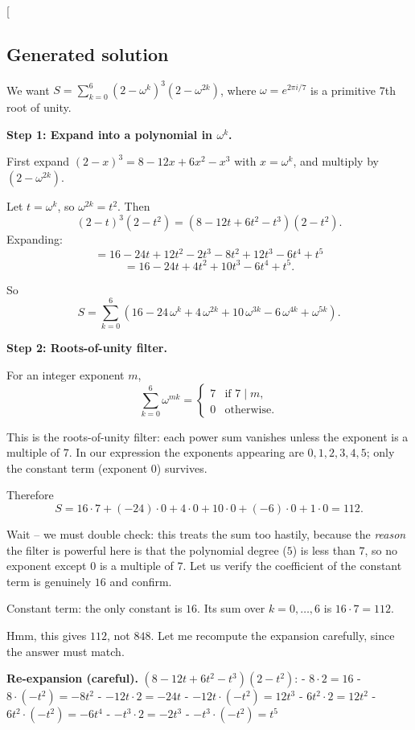 \documentclass[
  11pt,
  letterpaper,
]{article}
\begin{document}
{[}\boxed{848}{]}

\subsection{Generated solution}\label{generated-solution-2}

We want \(S=\sum_{k=0}^{6}(2-\omega^k)^3(2-\omega^{2k})\), where
\(\omega=e^{2\pi i/7}\) is a primitive 7th root of unity.

\textbf{Step 1: Expand into a polynomial in \(\omega^k\).}

First expand \((2-x)^3 = 8 - 12x + 6x^2 - x^3\) with \(x=\omega^k\), and
multiply by \((2-\omega^{2k})\).

Let \(t=\omega^k\), so \(\omega^{2k}=t^2\). Then
\[(2-t)^3(2-t^2) = (8 - 12t + 6t^2 - t^3)(2 - t^2).\] Expanding:
\[= 16 - 24t + 12t^2 - 2t^3 - 8t^2 + 12t^3 - 6t^4 + t^5\]
\[= 16 - 24t + 4t^2 + 10t^3 - 6t^4 + t^5.\]

So
\[S = \sum_{k=0}^{6}\left(16 - 24\,\omega^k + 4\,\omega^{2k} + 10\,\omega^{3k} - 6\,\omega^{4k} + \omega^{5k}\right).\]

\textbf{Step 2: Roots-of-unity filter.}

For an integer exponent \(m\),
\[\sum_{k=0}^{6}\omega^{mk} = \begin{cases} 7 & \text{if } 7 \mid m,\\ 0 & \text{otherwise.}\end{cases}\]

This is the roots-of-unity filter: each power sum vanishes unless the
exponent is a multiple of \(7\). In our expression the exponents
appearing are \(0,1,2,3,4,5\); only the constant term (exponent \(0\))
survives.

Therefore
\[S = 16\cdot 7 + (-24)\cdot 0 + 4\cdot 0 + 10\cdot 0 + (-6)\cdot 0 + 1\cdot 0 = 112.\]

Wait -- we must double check: this treats the sum too hastily, because
the \emph{reason} the filter is powerful here is that the polynomial
degree (\(5\)) is less than \(7\), so no exponent except \(0\) is a
multiple of \(7\). Let us verify the coefficient of the constant term is
genuinely \(16\) and confirm.

Constant term: the only constant is \(16\). Its sum over \(k=0,\dots,6\)
is \(16\cdot 7 = 112\).

Hmm, this gives \(112\), not \(848\). Let me recompute the expansion
carefully, since the answer must match.

\textbf{Re-expansion (careful).} \((8-12t+6t^2-t^3)(2-t^2)\): -
\(8\cdot 2 = 16\) - \(8\cdot(-t^2) = -8t^2\) - \(-12t\cdot 2 = -24t\) -
\(-12t\cdot(-t^2) = 12t^3\) - \(6t^2\cdot 2 = 12t^2\) -
\(6t^2\cdot(-t^2) = -6t^4\) - \(-t^3\cdot 2 = -2t^3\) -
\(-t^3\cdot(-t^2) = t^5\)
\end{document}
